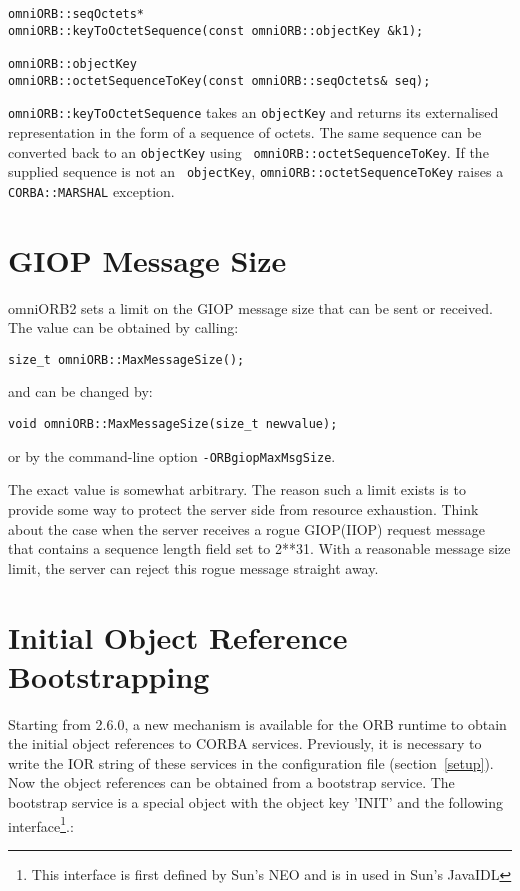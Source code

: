 \documentclass[11pt,twoside,onecolumn]{book}
\begin{document}
{\small
\begin{verbatim}
omniORB::seqOctets*
omniORB::keyToOctetSequence(const omniORB::objectKey &k1);

omniORB::objectKey
omniORB::octetSequenceToKey(const omniORB::seqOctets& seq);
\end{verbatim}
}

{\tt omniORB::keyToOctetSequence} takes an {\tt objectKey} and returns its
externalised representation in the form of a sequence of octets. The same
sequence can be converted back to an {\tt objectKey} using {\tt
omniORB::octetSequenceToKey}. If the supplied sequence is not an {\tt
objectKey}, {\tt omniORB::octetSequenceToKey} raises a {\tt CORBA::MARSHAL}
exception.


\section{GIOP Message Size}
\label{giopmsg}

omniORB2 sets a limit on the GIOP message size that can be sent or
received. The value can be obtained by calling:
{\small
\begin{verbatim}
size_t omniORB::MaxMessageSize();
\end{verbatim}
}
\noindent and can be changed by:

{\small
\begin{verbatim}
void omniORB::MaxMessageSize(size_t newvalue);
\end{verbatim}
}

\noindent or by the command-line option {\tt -ORBgiopMaxMsgSize}.

The exact value is somewhat arbitrary. The reason such a limit exists is to
provide some way to protect the server side from resource exhaustion. Think
about the case when the server receives a rogue GIOP(IIOP) request message
that contains a sequence length field set to 2**31. With a reasonable
message size limit, the server can reject this rogue message straight away.

\section{Initial Object Reference Bootstrapping}
\label{bootstrap}

Starting from 2.6.0, a new mechanism is available for the ORB runtime to
obtain the initial object references to CORBA services. Previously, it is
necessary to write the IOR string of these services in the configuration
file (section~\ref{setup}). Now the object references can be obtained from
a bootstrap service. The bootstrap service is a special object with the
object key 'INIT' and the following interface\footnote{This interface is
first defined by Sun's NEO and is in used in Sun's JavaIDL}.:
\end{document}
